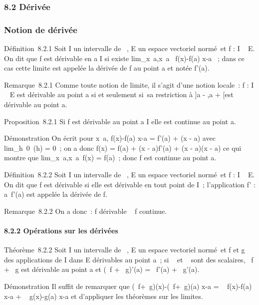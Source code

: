 
\subsubsection{8.2 Dérivée}

\subsubsection{Notion de dérivée}
\label{sec:notion-de-derivee}



Définition~8.2.1 Soit I un intervalle de ~, E un espace vectoriel
normé~et f : I \rightarrow~ E. On dit que f est dérivable en a \in I si existe
lim_x\rightarrow~a,x\neq~a~
f(x)-f(a) \over x-a ~; dans ce cas cette limite est
appelée la dérivée de f au point a et notée f'(a).

Remarque~8.2.1 Comme toute notion de limite, il s'agit d'une notion
locale~: f : I \rightarrow~ E est dérivable au point a si et seulement si~sa
restriction à ]a - \eta,a + \eta[\bigcapI est dérivable au point a.

Proposition~8.2.1 Si f est dérivable au point a \in I elle est continue au
point a.

Démonstration On écrit pour x\neq~a,  f(x)-f(a)
\over x-a = f'(a) + \epsilon(x - a) avec
lim_h\rightarrow~0~\epsilon(h) = 0~; on a donc f(x) =
f(a) + (x - a)f'(a) + (x - a)\epsilon(x - a) ce qui montre que
lim_x\rightarrow~a,x\neq~a~f(x)
= f(a)~; donc f est continue au point a.

Définition~8.2.2 Soit I un intervalle de ~, E un espace vectoriel
normé~et f : I \rightarrow~ E. On dit que f est dérivable si elle est dérivable en
tout point de I~; l'application f' : a\mapsto~f'(a)
est appelée la dérivée de f.

Remarque~8.2.2 On a donc~: f dérivable \rigtharrow~ f continue.

\paragraph{8.2.2 Opérations sur les dérivées}

Théorème~8.2.2 Soit I un intervalle de ~, E un espace vectoriel normé~et
f et g des applications de I dans E dérivables au point a~; si \alpha~ et \beta~
sont des scalaires, \alpha~f + \beta~g est dérivable au point a et (\alpha~f + \beta~g)'(a) =
\alpha~f'(a) + \beta~g'(a).

Démonstration Il suffit de remarquer que  (\alpha~f+\beta~g)(x)-(\alpha~f+\beta~g)(a)
\over x-a = \alpha~ f(x)-f(a) \over x-a +
\beta~ g(x)-g(a) \over x-a et d'appliquer les théorèmes
sur les limites.

